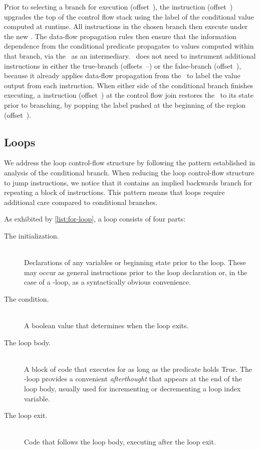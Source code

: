 Prior to selecting a branch for execution (offset~), the \join instruction (offset~) upgrades the top of the control flow stack using the label of the conditional value computed at runtime.
All instructions in the chosen branch then execute under the new \pclabel.
The data-flow propagation rules then ensure that the information dependence from the conditional predicate propagates to values computed within that branch, via the \pclabel\ as an intermediary.
\FlowCore\ does not need to instrument additional instructions in either the true-branch (offsets~--) or the false-branch (offset~), because it already applies data-flow propagation from the \pclabel\ to label the value output from each instruction.
When either side of the conditional branch finishes executing, a \popj instruction (offset~) at the control flow join restores the \pclabel\ to its state prior to branching, by popping the label pushed at the beginning of the region (offset~).

\subsection{Loops}

We address the loop control-flow structure by following the pattern established in analysis of the conditional branch.
When reducing the loop control-flow structure to jump instructions, we notice that it contains an implied backwards branch for repeating a block of instructions.
This pattern means that loops require additional care compared to conditional branches.

As exhibited by \autoref{list:for-loop}, a loop consists of four parts:
\begin{description}
  \item [The initialization.] \hfill \\
    Declarations of any variables or beginning state prior to the loop.
    These may occur as general instructions prior to the loop declaration or, in the case of a -loop, as a syntactically obvious convenience.
  \item [The condition.] \hfill \\
    A boolean value that determines when the loop exits.
  \item [The loop body.] \hfill \\
    A block of code that executes for as long as the predicate holds True.
    The -loop provides a convenient \emph{afterthought} that appears at the end of the loop body, usually used for incrementing or decrementing a loop index variable.
  \item [The loop exit.] \hfill \\
    Code that follows the loop body, executing after the loop exit.
\end{description}

